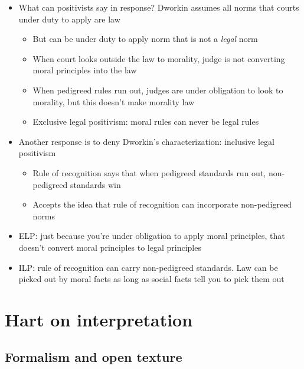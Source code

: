 \begin{itemize}
\tightlist
\item
  What can positivists say in response? Dworkin assumes all norms that
  courts under duty to apply are law

  \begin{itemize}
  \tightlist
  \item
    But can be under duty to apply norm that is not a \emph{legal} norm
  \item
    When court looks outside the law to morality, judge is not
    converting moral principles into the law
  \item
    When pedigreed rules run out, judges are under obligation to look to
    morality, but this doesn't make morality law
  \item
    Exclusive legal positivism: moral rules can never be legal rules
  \end{itemize}
\item
  Another response is to deny Dworkin's characterization: inclusive
  legal positivism

  \begin{itemize}
  \tightlist
  \item
    Rule of recognition says that when pedigreed standards run out,
    non-pedigreed standards win
  \item
    Accepts the idea that rule of recognition can incorporate
    non-pedigreed norms
  \end{itemize}
\item
  ELP: just because you're under obligation to apply moral principles,
  that doesn't convert moral principles to legal principles
\item
  ILP: rule of recognition can carry non-pedigreed standards. Law can be
  picked out by moral facts as long as social facts tell you to pick
  them out
\end{itemize}

\hypertarget{hart-on-interpretation}{%
\section{Hart on interpretation}\label{hart-on-interpretation}}

\hypertarget{formalism-and-open-texture}{%
\subsection{Formalism and open
texture}\label{formalism-and-open-texture}}

